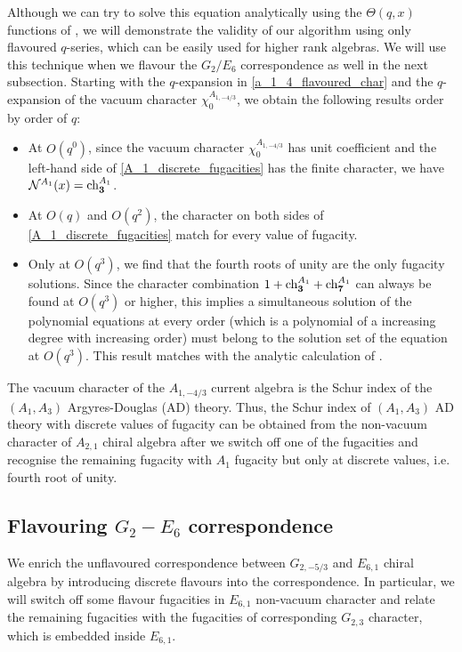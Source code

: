\documentclass[a4paper,12pt]{article}
\begin{document}
Although we can try to solve this equation analytically using the $\Theta(q,x)$ functions of \cite{Kac:1988qc}, we will demonstrate the validity of our algorithm using only flavoured $q$-series, which can be easily used for higher rank algebras. We will use this technique when we flavour the $G_2/E_6$ correspondence as well in the next subsection. Starting with the $q$-expansion in \eqref{a_1_4_flavoured_char} and the $q$-expansion of the vacuum character $\chi_{0}^{A_{1,-4/3}}$, we obtain the following results order by order of $q$:
\begin{itemize}
    \item At $\textit{O}(q^0)$, since the vacuum character $\chi_{0}^{A_{1,-4/3}}$ has unit coefficient and the left-hand side of \eqref{A_1_discrete_fugacities} has the finite character, we have $\mathcal{N}^{A_1}(x)=\mathrm{ch}^{A_1}_{\bf 3}$.
    \item At $\textit{O}(q)$ and $\textit{O}(q^2)$, the character on both sides of \eqref{A_1_discrete_fugacities} match for every value of fugacity. 
    \item Only at $\textit{O}(q^3)$, we find that the fourth roots of unity are the only fugacity solutions.  Since the character combination $1+\mathrm{ch}^{A_1}_{\bf 3}+\mathrm{ch}^{A_1}_{\bf 7}$ can always be found at $\textit{O}(q^3)$ or higher, this implies a simultaneous solution of the polynomial equations at every order (which is a polynomial of a increasing degree with increasing order) must belong to the solution set of the equation at $\textit{O}(q^3)$. This result matches with the analytic calculation of \cite{Buican:2019huq}.
\end{itemize}

The vacuum character of the $A_{1,-4/3}$ current algebra is the Schur index of the $(A_1,A_3)$ Argyres-Douglas (AD) theory. Thus, the Schur index of $(A_1,A_3)$ AD theory with discrete values of fugacity can be obtained from the non-vacuum character of $A_{2,1}$ chiral algebra after we switch off one of the fugacities and recognise the remaining fugacity with $A_1$ fugacity but only at discrete values, i.e. fourth root of unity. 

\subsection{Flavouring \ensuremath{G_2-E_6} correspondence}\label{Flavouring G2/E6 correspondence}
We enrich the unflavoured correspondence between $G_{2,-5/3}$ and $E_{6,1}$ chiral algebra by introducing discrete flavours into the correspondence. In particular, we will switch off some flavour fugacities in $E_{6,1}$ non-vacuum character and relate the remaining fugacities with the fugacities of corresponding $G_{2,3}$ character, which is embedded inside $E_{6,1}$.
\end{document}
